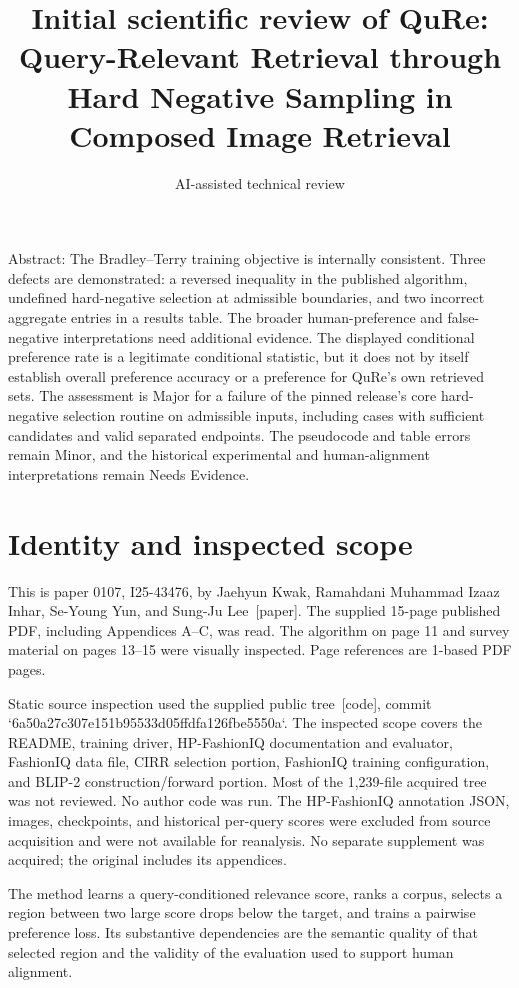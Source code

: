 \documentclass[10pt]{article}
\title{Initial scientific review of
QuRe: Query-Relevant Retrieval through Hard Negative Sampling in Composed Image Retrieval}
\author{AI-assisted technical review}
\date{}
\begin{document}
\maketitle
Abstract: The Bradley–Terry training objective is internally consistent. Three defects are demonstrated: a reversed inequality in the published algorithm, undefined hard-negative selection at admissible boundaries, and two incorrect aggregate entries in a results table. The broader human-preference and false-negative interpretations need additional evidence. The displayed conditional preference rate is a legitimate conditional statistic, but it does not by itself establish overall preference accuracy or a preference for QuRe’s own retrieved sets. The assessment is Major for a failure of the pinned release’s core hard-negative selection routine on admissible inputs, including cases with sufficient candidates and valid separated endpoints. The pseudocode and table errors remain Minor, and the historical experimental and human-alignment interpretations remain Needs Evidence.\par
\section*{Identity and inspected scope}
This is paper 0107, I25-43476, by Jaehyun Kwak, Ramahdani Muhammad Izaaz Inhar, Se-Young Yun, and Sung-Ju Lee [paper]. The supplied 15-page published PDF, including Appendices A–C, was read. The algorithm on page 11 and survey material on pages 13–15 were visually inspected. Page references are 1-based PDF pages.\par
Static source inspection used the supplied public tree [code], commit `6a50a27c307e151b95533d05ffdfa126fbe5550a`. The inspected scope covers the README, training driver, HP-FashionIQ documentation and evaluator, FashionIQ data file, CIRR selection portion, FashionIQ training configuration, and BLIP-2 construction/forward portion. Most of the 1,239-file acquired tree was not reviewed. No author code was run. The HP-FashionIQ annotation JSON, images, checkpoints, and historical per-query scores were excluded from source acquisition and were not available for reanalysis. No separate supplement was acquired; the original includes its appendices.\par
The method learns a query-conditioned relevance score, ranks a corpus, selects a region between two large score drops below the target, and trains a pairwise preference loss. Its substantive dependencies are the semantic quality of that selected region and the validity of the evaluation used to support human alignment.\par
\end{document}
